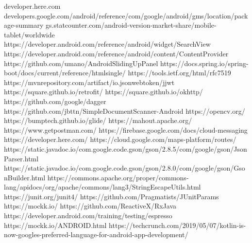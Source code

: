 \documentclass[10pt,twoside,a4paper]{report}
\begin{document}

\begin{thebibliography}{1}
   developer.here.com
   developers.google.com/android/reference/com/google/android/gms/location/package-summary
   gs.statcounter.com/android-version-market-share/mobile-tablet/worldwide
   https://developer.android.com/reference/android/widget/SearchView
   https://developer.android.com/reference/android/content/ContentProvider
   https://github.com/umano/AndroidSlidingUpPanel
   https://docs.spring.io/spring-boot/docs/current/reference/htmlsingle/
   https://tools.ietf.org/html/rfc7519
   https://mvnrepository.com/artifact/io.jsonwebtoken/jjwt
   https://square.github.io/retrofit/
   https://square.github.io/okhttp/
   https://github.com/google/dagger
   https://github.com/jbttn/SimpleDocumentScanner-Android
   https://opencv.org/
   https://bumptech.github.io/glide/
   https://mahout.apache.org/
   https://www.getpostman.com/
   https://firebase.google.com/docs/cloud-messaging
   https://developer.here.com/
   https://cloud.google.com/maps-platform/routes/
   https://static.javadoc.io/com.google.code.gson/gson/2.8.5/com/google/gson/JsonParser.html
   https://static.javadoc.io/com.google.code.gson/gson/2.8.0/com/google/gson/GsonBuilder.html
   https://commons.apache.org/proper/commons-lang/apidocs/org/apache/commons/lang3/StringEscapeUtils.html
   https://junit.org/junit4/
   https://github.com/Pragmatists/JUnitParams
   https://mockk.io/
   https://github.com/ReactiveX/RxJava
   https://developer.android.com/training/testing/espresso
   https://mockk.io/ANDROID.html
   https://techcrunch.com/2019/05/07/kotlin-is-now-googles-preferred-language-for-android-app-development/
\end{thebibliography}


\listoffigures
\listoftables
\end{document}
